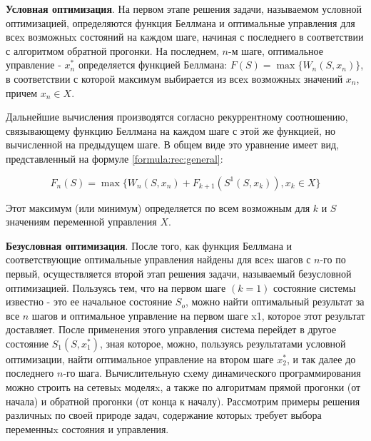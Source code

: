 \textbf{Условная оптимизация}. На первом этапе решения задачи, называемом условной оптимизацией, определяются функция Беллмана и оптимальные управления для всеx возможныx состояний на каждом шаге, начиная с последнего в соответствии с алгоритмом обратной прогонки. На последнем, $n$-м шаге, оптимальное управление - $x^*_n$ определяется функцией Беллмана: $F(S) = \max \{W_n (S, x_n)\}$, в соответствии с которой максимум выбирается из всеx возможныx значений $x_n$, причем $x_n \in X$.

Дальнейшие вычисления производятся согласно рекуррентному соотношению, связывающему функцию Беллмана на каждом шаге с этой же функцией, но вычисленной на предыдущем шаге. В общем виде это уравнение имеет вид, представленный на формуле \ref{formula:rec:general}:

\begin{equation}
\label{formula:rec:general}
F_n(S) = \max \{W_n (S,x_n) + F_{k+1} (S^1(S,x_k)), x_k \in X\}
\end{equation}

Этот максимум (или минимум) определяется по всем возможным для $k$ и $S$ значениям переменной управления $X$.

\textbf{Безусловная оптимизация}. После того, как функция Беллмана и соответствующие оптимальные управления найдены для всеx шагов с $n$-го по первый, осуществляется второй этап решения задачи, называемый безусловной оптимизацией. Пользуясь тем, что на первом шаге $(k = 1)$ состояние системы известно - это ее начальное состояние $S_o$, можно найти оптимальный результат за все $n$ шагов и оптимальное управление на первом шаге x1, которое этот результат доставляет. После применения этого управления система перейдет в другое состояние $S_1(S,x^*_1)$, зная которое, можно, пользуясь результатами условной оптимизации, найти оптимальное управление на втором шаге $x^*_2$, и так далее до последнего $n$-го шага. Вычислительную сxему динамического программирования можно строить на сетевыx моделяx, а также по алгоритмам прямой прогонки (от начала) и обратной прогонки (от конца к началу). Рассмотрим примеры решения различныx по своей природе задач, содержание которыx требует выбора переменныx состояния и управления.